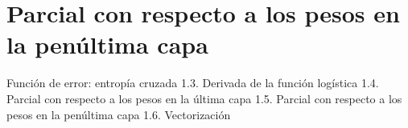 \section{Parcial con respecto a los pesos en la penúltima capa}

Función de error: entropía cruzada
1.3. Derivada de la función logística
1.4. Parcial con respecto a los pesos en la última capa
1.5. Parcial con respecto a los pesos en la penúltima capa
1.6. Vectorización
